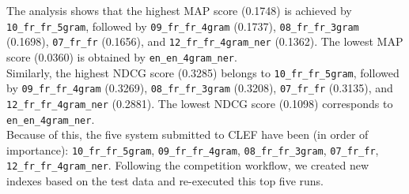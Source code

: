 The analysis shows that the highest MAP score (0.1748) is achieved by \texttt{10\_fr\_fr\_5gram}, followed by
\texttt{09\_fr\_fr\_4gram} (0.1737),
\texttt{08\_fr\_fr\_3gram} (0.1698),
\texttt{07\_fr\_fr} (0.1656), and
\texttt{12\_fr\_fr\_4gram\_ner} (0.1362).
The lowest MAP score (0.0360) is obtained by \texttt{en\_en\_4gram\_ner}.\\

Similarly, the highest NDCG score (0.3285) belongs to \texttt{10\_fr\_fr\_5gram}, followed by
\texttt{09\_fr\_fr\_4gram} (0.3269),
\texttt{08\_fr\_fr\_3gram} (0.3208),
\texttt{07\_fr\_fr} (0.3135), and
\texttt{12\_fr\_fr\_4gram\_ner} (0.2881).
The lowest NDCG score (0.1098) corresponds to \texttt{en\_en\_4gram\_ner}.\\

Because of this, the five system submitted to CLEF have been (in order of importance): \texttt{10\_fr\_fr\_5gram},
\texttt{09\_fr\_fr\_4gram}, \texttt{08\_fr\_fr\_3gram}, \texttt{07\_fr\_fr}, \texttt{12\_fr\_fr\_4gram\_ner}.
Following the competition workflow, we created new indexes based on the test data and re-executed this top five runs.\\

